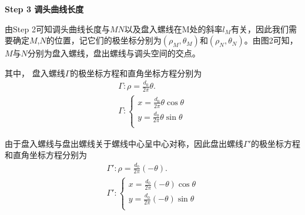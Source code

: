 \documentclass[../main.tex]{subfiles}
\begin{document}
\noindent\textbf{Step 3 调头曲线长度} 
\par 由Step 2可知调头曲线长度与$MN$以及盘入螺线在M处的斜率$l_M$有关，因此我们需要确定$M$,$N$的位置，记它们的极坐标分别为$(\rho_M,\theta_M)$和$(\rho_N,\theta_N)$。由图2可知，$M$与$N$分别为盘入螺线，盘出螺线与调头空间的交点。
\par 其中， 盘入螺线\(\varGamma\)的极坐标方程和直角坐标方程分别为
\begin{gather}
\varGamma :\rho =\frac{d_0}{2\pi}\theta.\label{7.3.1}
\\
\varGamma :\begin{cases}\label{7.4.1}
x=\frac{d_0}{2\pi}\theta \cos \theta\\
y=\frac{d_0}{2\pi}\theta \sin \theta\\
\end{cases}
\end{gather}

\par 由于盘入螺线与盘出螺线关于螺线中心呈中心对称，因此盘出螺线$\varGamma'$的极坐标方程和直角坐标方程分别为
\begin{gather}
\varGamma':\rho =\frac{d_0}{2\pi}\left( -\theta \right) .\label{7.3.2}  \\
\varGamma':\begin{cases}\label{7.4.2}
x=\frac{d_0}{2\pi}\left( -\theta \right) \cos \theta\\
y=\frac{d_0}{2\pi}\left( -\theta \right) \sin \theta\\
\end{cases}
\end{gather}
\end{document}
